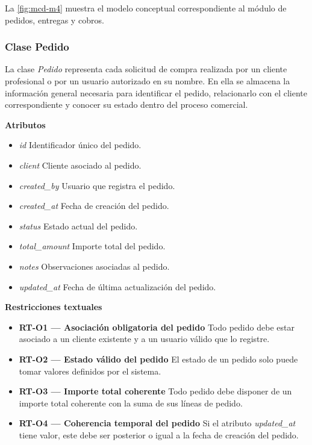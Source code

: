 La \autoref{fig:mcd-m4} muestra el modelo conceptual correspondiente al módulo de pedidos, entregas y cobros.


\subsubsection{Clase Pedido}

La clase \textit{Pedido} representa cada solicitud de compra realizada por un cliente profesional o por un usuario autorizado en su nombre. En ella se almacena la información general necesaria para identificar el pedido, relacionarlo con el cliente correspondiente y conocer su estado dentro del proceso comercial.

\textbf{Atributos}

\begin{itemize}
      \item \textit{id}
            Identificador único del pedido.
      \item \textit{client}
            Cliente asociado al pedido.
      \item \textit{created\_by}
            Usuario que registra el pedido.
      \item \textit{created\_at}
            Fecha de creación del pedido.
      \item \textit{status}
            Estado actual del pedido.
      \item \textit{total\_amount}
            Importe total del pedido.
      \item \textit{notes}
            Observaciones asociadas al pedido.
      \item \textit{updated\_at}
            Fecha de última actualización del pedido.
\end{itemize}

\textbf{Restricciones textuales}

\begin{itemize}
      \item \textbf{RT-O1 — Asociación obligatoria del pedido}
            Todo pedido debe estar asociado a un cliente existente y a un usuario válido que lo registre.
      \item \textbf{RT-O2 — Estado válido del pedido}
            El estado de un pedido solo puede tomar valores definidos por el sistema.
      \item \textbf{RT-O3 — Importe total coherente}
            Todo pedido debe disponer de un importe total coherente con la suma de sus líneas de pedido.
      \item \textbf{RT-O4 — Coherencia temporal del pedido}
            Si el atributo \textit{updated\_at} tiene valor, este debe ser posterior o igual a la fecha de creación del pedido.
\end{itemize}

